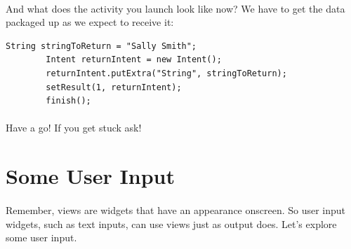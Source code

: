 \documentclass[12pt, a4paper, twoside]{book}
\begin{document}
\paragraph{} And what does the activity you launch look like now? We have to get the data packaged up as we expect to receive it:

\begin{lstlisting}
String stringToReturn = "Sally Smith";
        Intent returnIntent = new Intent();
        returnIntent.putExtra("String", stringToReturn);
        setResult(1, returnIntent);
        finish();
\end{lstlisting}

\paragraph{} Have a go! If you get stuck ask!





\section{Some User Input}
\paragraph{} Remember, views are widgets that have an appearance onscreen. So user input widgets, such as text inputs, can use views just as output does. Let's explore some user input.
\end{document}
